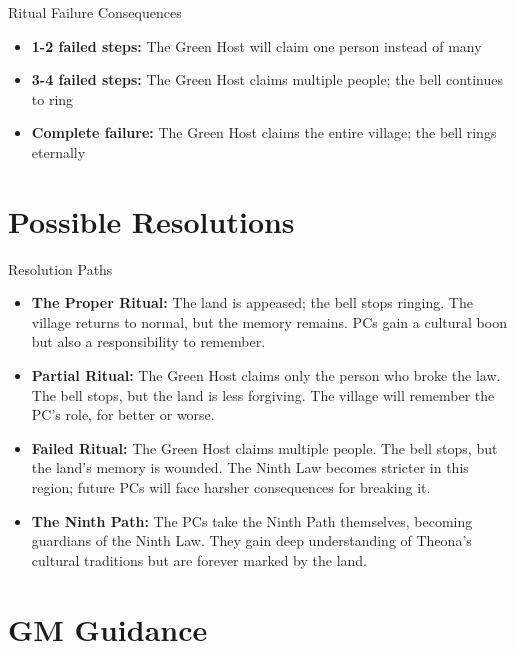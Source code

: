 \documentclass[11pt]{article}
\begin{document}
\begin{mechanicsbox}{Ritual Failure Consequences}
\begin{itemize}
    \item \textbf{1-2 failed steps:} The Green Host will claim one person instead of many
    \item \textbf{3-4 failed steps:} The Green Host claims multiple people; the bell continues to ring
    \item \textbf{Complete failure:} The Green Host claims the entire village; the bell rings eternally
\end{itemize}
\end{mechanicsbox}

\section*{Possible Resolutions}

\begin{mechanicsbox}{Resolution Paths}
\begin{itemize}
    \item \textbf{The Proper Ritual:} The land is appeased; the bell stops ringing. The village returns to normal, but the memory remains. PCs gain a cultural boon but also a responsibility to remember.
    
    \item \textbf{Partial Ritual:} The Green Host claims only the person who broke the law. The bell stops, but the land is less forgiving. The village will remember the PC's role, for better or worse.
    
    \item \textbf{Failed Ritual:} The Green Host claims multiple people. The bell stops, but the land's memory is wounded. The Ninth Law becomes stricter in this region; future PCs will face harsher consequences for breaking it.
    
    \item \textbf{The Ninth Path:} The PCs take the Ninth Path themselves, becoming guardians of the Ninth Law. They gain deep understanding of Theona's cultural traditions but are forever marked by the land.
\end{itemize}
\end{mechanicsbox}

\section*{GM Guidance}
\end{document}
